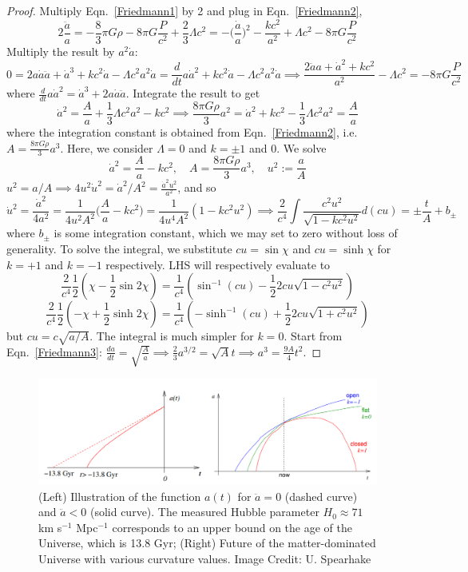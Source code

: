 \documentclass[a4paper]{article}
\theoremstyle{new}
\begin{document}
\begin{proof}
Multiply Eqn.~\ref{Friedmann1} by 2 and plug in Eqn.~\ref{Friedmann2},
$$2\frac{\ddot{a}}{a}=-\frac{8}{3}\pi G\rho-8\pi G\frac{P}{c^2}+\frac{2}{3}\Lambda c^2=-\bigg(\frac{\dot{a}}{a}\bigg)^2-\frac{kc^2}{a^2}+\Lambda c^2-8\pi G\frac{P}{c^2}$$
Multiply the result by $a^2\dot{a}$:
\begin{equation}
0=2a\dot{a}\ddot{a}+\dot{a}^3+kc^2\dot{a}-\Lambda c^2a^2\dot{a}=\frac{d}{dt}a\dot{a}^2+kc^2\dot{a}-\Lambda c^2a^2\dot{a}\implies\frac{2\ddot{a}a+\dot{a}^2+kc^2}{a^2}-\Lambda c^2=-8\pi G\frac{P}{c^2}\label{Friedmann3}
\end{equation}
where $\frac{d}{dt}a\dot{a}^2=\dot{a}^3+2a\dot{a}\ddot{a}$. Integrate the result to get
\begin{equation}
\dot{a}^2=\frac{A}{a}+\frac{1}{3}\Lambda c^2a^2-kc^2\implies\frac{8\pi G\rho}{3}a^2=\dot{a}^2+kc^2-\frac{1}{3}\Lambda c^2a^2=\frac{A}{a}\label{Friedmann4}
\end{equation}
where the integration constant is obtained from Eqn.~\ref{Friedmann2}, i.e. $A=\frac{8\pi G\rho}{3}a^3$. Here, we consider $\Lambda=0$ and $k=\pm1$ and 0. We solve
$$\dot{a}^2=\frac{A}{a}-kc^2,\quad A=\frac{8\pi G\rho}{3}a^3,\quad u^2:=\frac{a}{A}$$
$u^2=a/A\implies 4u^2\dot{u}^2=\dot{a}^2/A^2=\frac{\dot{a}^2u^2}{a^2}$, and so
$$\dot{u}^2=\frac{\dot{a}^2}{4a^2}=\frac{1}{4u^2A^2}\bigg(\frac{A}{a}-kc^2\bigg)=\frac{1}{4u^4A^2}(1-kc^2u^2)\implies\frac{2}{c^4}\int\frac{c^2u^2}{\sqrt{1-kc^2u^2}}d(cu)=\pm\frac{t}{A}+b_\pm$$
where $b_\pm$ is some integration constant, which we may set to zero without loss of generality. To solve the integral, we substitute $cu=\sin\chi$ and $cu=\sinh\chi$ for $k=+1$ and $k=-1$ respectively. LHS will respectively evaluate to
$$\frac{2}{c^4}\frac{1}{2}(\chi-\frac{1}{2}\sin2\chi)=\frac{1}{c^4}(\sin^{-1}(cu)-\frac{1}{2}2cu\sqrt{1-c^2u^2})$$
$$\frac{2}{c^4}\frac{1}{2}(-\chi+\frac{1}{2}\sinh2\chi)=\frac{1}{c^4}(-\sinh^{-1}(cu)+\frac{1}{2}2cu\sqrt{1+c^2u^2})$$
but $cu=c\sqrt{a/A}$. The integral is much simpler for $k=0$. Start from Eqn.~\ref{Friedmann3}: $\frac{da}{dt}=\sqrt{\frac{A}{a}}\implies\frac{2}{3}a^{3/2}=\sqrt{A}t\implies a^3=\frac{9A}{4}t^2$.
\end{proof}
\begin{figure}[H]
    \centering
    \includegraphics[width=\linewidth]{bigbang.PNG}
    \caption{(Left) Illustration of the function $a(t)$ for $\ddot{a}=0$ (dashed curve) and $\ddot{a}<0$ (solid curve). The measured Hubble parameter $H_0\approx 71$ km s$^{-1}$ Mpc$^{-1}$ corresponds to an upper bound on the age of the Universe, which is 13.8 Gyr; (Right) Future of the matter-dominated Universe with various curvature values. Image Credit: U. Spearhake}
\end{figure}
\end{document}
